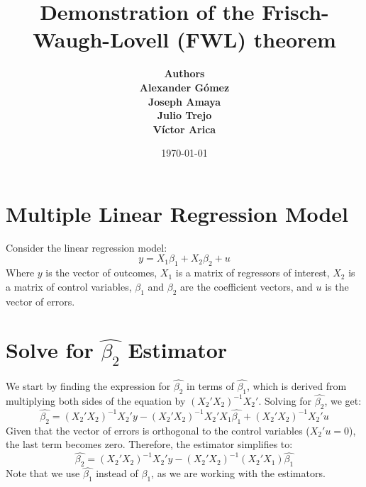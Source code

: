 \documentclass{article}
\title{Demonstration of the Frisch-Waugh-Lovell (FWL) theorem}
\author{\bfseries Authors \\
    Alexander Gómez \\
    Joseph Amaya \\
    Julio Trejo \\
    Víctor Arica
}
\date{\today}
\begin{document}
\maketitle
\section{Multiple Linear Regression Model}
Consider the linear regression model:
\begin{equation}
y = X_1\beta_1 + X_2\beta_2 + u
\end{equation}
Where $y$ is the vector of outcomes, $X_1$ is a matrix  of regressors of interest, $X_2$ is a  matrix of control variables, $\beta_1$ and $\beta_2$ are the coefficient vectors, and $u$ is the vector of errors.

\section{Solve for $\hat{\beta_2}$ Estimator}
We start by finding the expression for $\hat{\beta_2}$ in terms of $\hat{\beta_1}$, which is derived from multiplying both sides of the equation by $(X_2'X_2)^{-1}X_2'$. Solving for $\hat{\beta_2}$, we get:
\begin{equation}
\hat{\beta_2} = (X_2'X_2)^{-1}X_2'y - (X_2'X_2)^{-1}X_2'X_1\hat{\beta_1} + (X_2'X_2)^{-1}X_2'u
\end{equation}
Given that the vector of errors is orthogonal to the control variables ($X_2'u = 0$), the last term becomes zero. Therefore, the estimator simplifies to:
\begin{equation}
\hat{\beta_2} = (X_2'X_2)^{-1}X_2'y - (X_2'X_2)^{-1}(X_2'X_1)\hat{\beta_1}
\end{equation}
Note that we use $\hat{\beta_1}$ instead of $\beta_1$, as we are working with the estimators.
\end{document}
